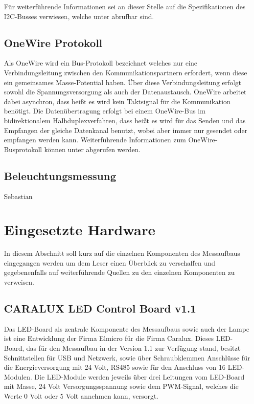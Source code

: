 \documentclass[a4paper,12pt]{scrartcl}
\begin{document}
F\"ur weiterf\"uhrende Informationen sei an dieser Stelle auf die Spezifikationen des I2C-Busses verwiesen, welche unter \cite{speci2c} abrufbar
sind.

\subsection{OneWire Protokoll}
Als OneWire wird ein Bus-Protokoll bezeichnet welches nur eine Verbindungsleitung zwischen den Kommunikationspartnern erfordert, wenn diese ein gemeinsames
Masse-Potential haben. \"Uber diese Verbindungsleitung erfolgt sowohl die Spannungsversorgung als auch der Datenaustausch. OneWire arbeitet dabei asynchron,
dass hei\ss{}t es wird kein Taktsignal f\"ur die Kommunikation ben\"otigt. Die Daten\"ubertragung erfolgt bei einem OneWire-Bus im bidirektionalem
Halbduplexverfahren, dass hei\ss{}t es wird f\"ur das Senden und das Empfangen der gleiche Datenkanal benutzt, wobei aber immer nur gesendet oder empfangen
werden kann. Weiterf\"uhrende Informationen zum OneWire-Busprotokoll k\"onnen unter \cite{spec1wire} abgerufen werden.

\subsection{Beleuchtungsmessung}
Sebastian

\section{Eingesetzte Hardware}
In diesem Abschnitt soll kurz auf die einzelnen Komponenten des Messaufbaus eingegangen werden um dem Leser einen Überblick zu verschaffen und gegebenenfalls auf weiterführende Quellen zu den einzelnen Komponenten zu verweisen.

\subsection{CARALUX LED Control Board v1.1}

Das LED-Board als zentrale Komponente des Messaufbaus sowie auch der Lampe ist eine Entwicklung der Firma Elmicro für die Firma Caralux. Dieses LED-Board, das
für den Messaufbau in der Version 1.1 zur Verfügung stand, besitzt Schnittstellen für USB und Netzwerk, sowie über Schraubklemmen Anschlüsse für die
Energieversorgung mit 24 Volt, RS485 sowie für den Anschluss von 16 LED-Modulen. Die LED-Module werden jeweils über drei Leitungen vom LED-Board mit Masse, 24
Volt Versorgungsspannung sowie dem PWM-Signal, welches die Werte 0 Volt oder 5 Volt annehmen kann, versorgt.
\end{document}
